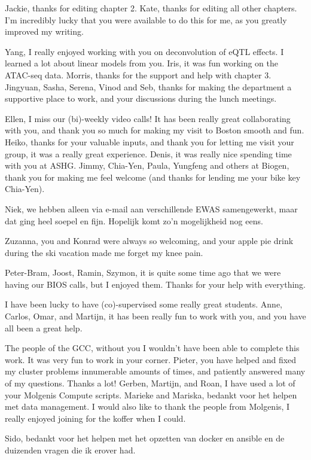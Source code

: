 \begin{appendices}
Jackie, thanks for editing chapter 2. Kate, thanks for editing all other chapters. I'm incredibly lucky that you were available to do this for me, as you greatly improved my writing. 

Yang, I really enjoyed working with you on deconvolution of eQTL effects. I learned a lot about linear models from you. Iris, it was fun working on the ATAC-seq data. Morris, thanks for the support and help with chapter 3. Jingyuan, Sasha, Serena, Vinod and Seb, thanks for making the department a supportive place to work, and your discussions during the lunch meetings.

Ellen, I miss our (bi)-weekly video calls! It has been really great collaborating with you, and thank you so much for making my visit to Boston smooth and fun. Heiko, thanks for your valuable inputs, and thank you for letting me visit your group, it was a really great experience. Denis, it was really nice spending time with you at ASHG. Jimmy, Chia-Yen, Paula, Yungfeng and others at Biogen, thank you for making me feel welcome (and thanks for lending me your bike key Chia-Yen).

Niek, we hebben alleen via e-mail aan verschillende EWAS samengewerkt, maar dat ging heel soepel en fijn. Hopelijk komt zo'n mogelijkheid nog eens. 

Zuzanna, you and Konrad were always so welcoming, and your apple pie drink during the ski vacation made me forget my knee pain.

Peter-Bram, Joost, Ramin, Szymon, it is quite some time ago that we were having our BIOS calls, but I enjoyed them. Thanks for your help with everything.

I have been lucky to have (co)-supervised some really great students. Anne, Carlos, Omar, and Martijn, it has been really fun to work with you, and you have all been a great help. 

The people of the GCC, without you I wouldn't have been able to complete this work. It was very fun to work in your corner. Pieter, you have helped and fixed my cluster problems innumerable amounts of times, and patiently answered many of my questions. Thanks a lot! Gerben, Martijn, and Roan, I have used a lot of your Molgenis Compute scripts. Marieke and Mariska, bedankt voor het helpen met data management. I would also like to thank the people from Molgenis, I really enjoyed joining for the koffer when I could. 

Sido, bedankt voor het helpen met het opzetten van docker en ansible en de duizenden vragen die ik erover had. 


\end{appendices}
